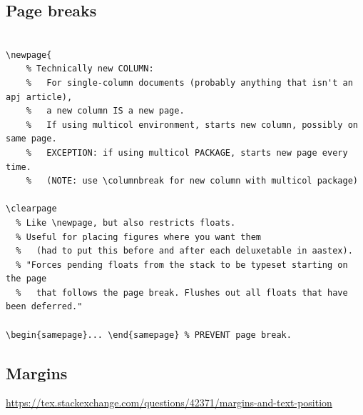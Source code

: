 \documentclass{article}
\begin{document}
\subsection{Page breaks}

\begin{lstlisting}

\newpage{
    % Technically new COLUMN:
    %   For single-column documents (probably anything that isn't an apj article),
    %   a new column IS a new page.
    %   If using multicol environment, starts new column, possibly on same page.
    %   EXCEPTION: if using multicol PACKAGE, starts new page every time.
    %   (NOTE: use \columnbreak for new column with multicol package)

\clearpage
  % Like \newpage, but also restricts floats.
  % Useful for placing figures where you want them
  %   (had to put this before and after each deluxetable in aastex).
  % "Forces pending floats from the stack to be typeset starting on the page
  %   that follows the page break. Flushes out all floats that have been deferred."

\begin{samepage}... \end{samepage} % PREVENT page break.

\end{lstlisting}


\subsection{Margins}
\url{https://tex.stackexchange.com/questions/42371/margins-and-text-position}
\end{document}
